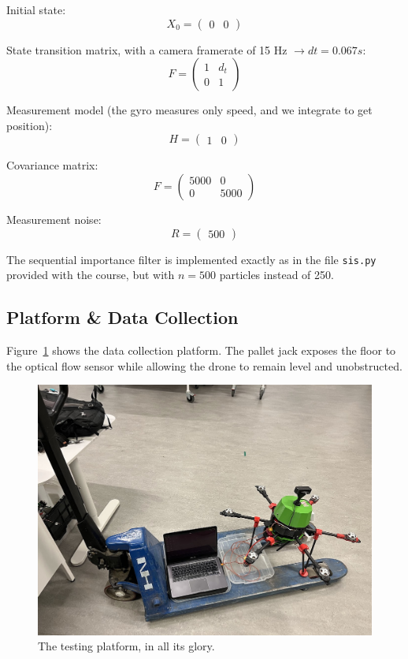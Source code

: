 Initial state:
$$X_0 =
\left(
\begin{matrix}
	0 & 0
\end{matrix}
\right)
$$

State transition matrix, with a camera framerate of 15 Hz $\rightarrow dt=0.067s$:
$$
F =
\left(
\begin{matrix}
	1 & d_t \\
	0 & 1
\end{matrix}
\right)
$$

Measurement model (the gyro measures only speed, and we integrate to get position):
$$H =
\left(
\begin{matrix}
	1 & 0
\end{matrix}
\right)
$$

Covariance matrix:
$$
F =
\left(
\begin{matrix}
	5000 & 0 \\
	0 & 5000
\end{matrix}
\right)
$$

Measurement noise:
$$
R =
\left(
\begin{matrix}
	500
\end{matrix}
\right)
$$

The sequential importance filter is implemented exactly as in the file \texttt{sis.py} provided with
the course, but with $n=500$ particles instead of 250.

\subsection{Platform \& Data Collection}

Figure~\ref{figure:testing_platform} shows the data collection platform.
The pallet jack exposes the floor to the optical flow sensor while allowing the drone to 
remain level and unobstructed.

\begin{figure}
	\centering
	\includegraphics[width=0.75\linewidth]{./images/testing_platform.jpg}
	\caption{The testing platform, in all its glory.}
	\label{figure:testing_platform}
\end{figure}

